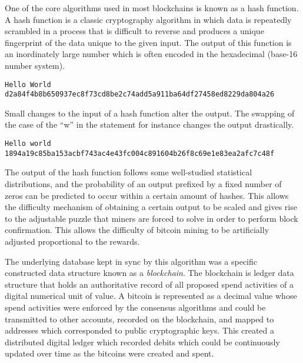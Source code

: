 
One of the core algorithms used in most blockchains is known as a hash
function. A hash function is a classic cryptography algorithm in which
data is repeatedly scrambled in a process that is difficult to reverse
and produces a unique fingerprint of the data unique to the
given input. The output of this function is an inordinately large number
which is often encoded in the hexadecimal (base-16 number system).


\begin{verbatim}
Hello World
d2a84f4b8b650937ec8f73cd8be2c74add5a911ba64df27458ed8229da804a26
\end{verbatim}

Small changes to the input of a hash function alter the output. The
swapping of the case of the ``w'' in the statement for instance changes
the output drastically.

\begin{verbatim}
Hello world
1894a19c85ba153acbf743ac4e43fc004c891604b26f8c69e1e83ea2afc7c48f
\end{verbatim}


The output of the hash function follows some well-studied statistical
distributions, and the probability of an output prefixed by a fixed number of
zeros can be predicted to occur within a certain amount of hashes. This allows
the difficulty mechanism of obtaining a certain output to be scaled and gives
rise to the adjustable puzzle that miners are forced to solve in order to
perform block confirmation. This allows the difficulty of bitcoin mining to
be artificially adjusted proportional to the rewards.

The underlying database kept in sync by this algorithm was a specific
constructed data structure known as a \textit{blockchain}. The blockchain is
ledger data structure that holds an authoritative record of all proposed spend
activities of a digital numerical unit of value. A bitcoin is represented as a
decimal value whose spend activities were enforced by the consensus algorithms
and could be transmitted to other accounts, recorded on the blockchain, and
mapped to addresses which corresponded to public cryptographic keys. This
created a distributed digital ledger which recorded debits which could be
continuously updated over time as the bitcoins were created and spent.


